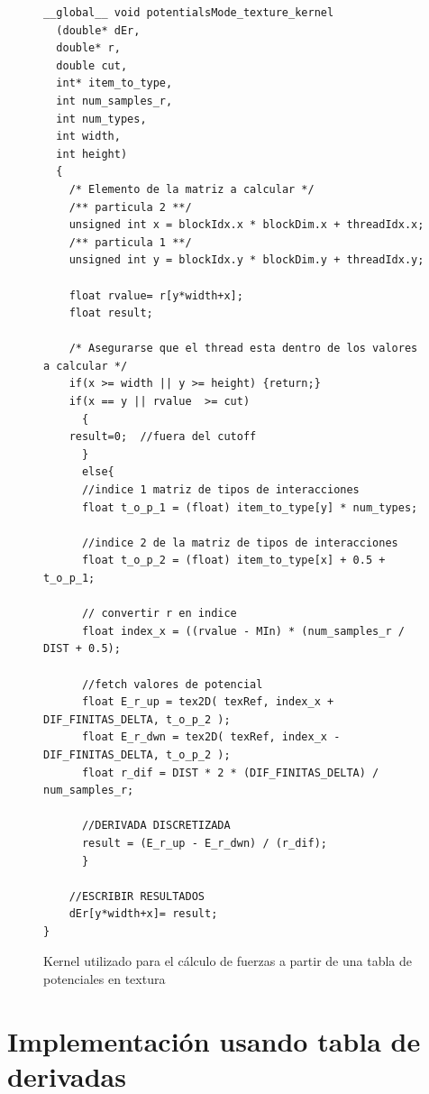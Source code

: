 \begin{figure}[htbp]
    \begin{lstlisting}
__global__ void potentialsMode_texture_kernel
  (double* dEr,
  double* r, 
  double cut, 
  int* item_to_type, 
  int num_samples_r, 
  int num_types, 
  int width, 
  int height)
  {
    /* Elemento de la matriz a calcular */
    /** particula 2 **/
    unsigned int x = blockIdx.x * blockDim.x + threadIdx.x;	
    /** particula 1 **/
    unsigned int y = blockIdx.y * blockDim.y + threadIdx.y;
    
    float rvalue= r[y*width+x]; 
    float result;
    
    /* Asegurarse que el thread esta dentro de los valores a calcular */
    if(x >= width || y >= height) {return;}
    if(x == y || rvalue  >= cut) 
      {
	result=0;  //fuera del cutoff
      }
      else{
      //indice 1 matriz de tipos de interacciones
      float t_o_p_1 = (float) item_to_type[y] * num_types;	
      
      //indice 2 de la matriz de tipos de interacciones
      float t_o_p_2 = (float) item_to_type[x] + 0.5 + t_o_p_1;	
      
      // convertir r en indice
      float index_x = ((rvalue - MIn) * (num_samples_r / DIST + 0.5);	
      
      //fetch valores de potencial
      float E_r_up = tex2D( texRef, index_x + DIF_FINITAS_DELTA, t_o_p_2 );
      float E_r_dwn = tex2D( texRef, index_x - DIF_FINITAS_DELTA, t_o_p_2 );
      float r_dif = DIST * 2 * (DIF_FINITAS_DELTA) / num_samples_r;
      
      //DERIVADA DISCRETIZADA
      result = (E_r_up - E_r_dwn) / (r_dif); 
      }
   
    //ESCRIBIR RESULTADOS
    dEr[y*width+x]= result;
}
    \end{lstlisting}
    \caption{Kernel utilizado para el cálculo de fuerzas a partir de una tabla de potenciales en textura}
    \label{code:potentialsKernel}
\end{figure}



\section{Implementación usando tabla de derivadas}



